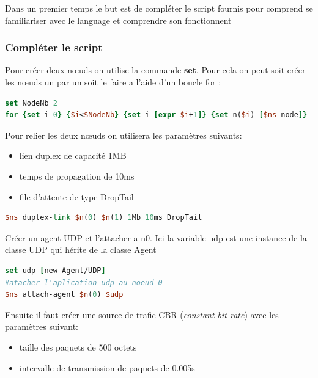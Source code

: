 \documentclass[11pt]{article}
\begin{document}
Dans un premier temps le but est de compléter le script fournis pour comprend se familiariser avec le language et comprendre son fonctionnent

\subsubsection{Compléter le script}
\noindent 
Pour créer deux nœuds on utilise la commande \textbf{set}. Pour cela on peut soit créer les nœuds un par un soit le faire a l'aide d'un boucle for :

\begin{lstlisting}[language=tcl, numbers=none, framexleftmargin=0pt, framextopmargin=0pt, framexbottommargin=0pt]
set NodeNb 2
for {set i 0} {$i<$NodeNb} {set i [expr $i+1]} {set n($i) [$ns node]}
\end{lstlisting}

\noindent %
Pour relier les deux nœuds on utilisera les paramètres suivants:
\begin{itemize}
	\item lien duplex de capacité 1MB
	\item temps de propagation de 10ms
	\item file d'attente de type DropTail
\end{itemize}

\begin{lstlisting}[language=tcl, numbers=none, framexleftmargin=0pt, 	framextopmargin=0pt, framexbottommargin=0pt]
$ns duplex-link $n(0) $n(1) 1Mb 10ms DropTail
\end{lstlisting}

\noindent
Créer un agent UDP et l'attacher a n0. Ici la variable udp est une instance de la classe UDP qui hérite de la classe Agent

\begin{lstlisting}[language=tcl, numbers=none, framexleftmargin=0pt, 	framextopmargin=0pt, framexbottommargin=0pt]
set udp [new Agent/UDP]
#atacher l'aplication udp au noeud 0
$ns attach-agent $n(0) $udp 
\end{lstlisting}


Ensuite il faut créer une source de trafic CBR (\textit{constant bit rate}) avec les paramètres suivant:
\begin{itemize}
	\item taille des paquets de 500 octets
	\item intervalle de transmission de paquets de 0.005s
\end{itemize}
\end{document}
